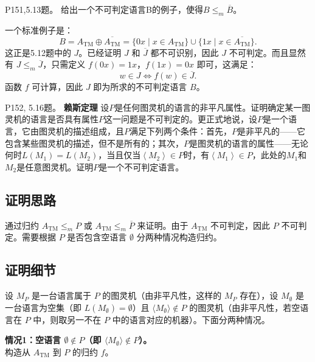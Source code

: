 \documentclass[11pt,addpoints,answers]{exam}
\begin{document}
\begin{questions}
\question P151,5.13题。
给出一个不可判定语言B的例子，使得$B\leq _{m} \overline{B}$。
\begin{solution}
	一个标准例子是：
    \[
    B = A_{\mathrm{TM}} \oplus \overline{A_{\mathrm{TM}}} = \{0x \mid x \in A_{\mathrm{TM}}\} \cup \{1x \mid x \in \overline{A_{\mathrm{TM}}}\}.
    \]
    这正是5.12题中的 $J$。已经证明 $J$ 和 $\overline{J}$ 都不可识别，因此 $J$ 不可判定。而且显然有 $J \leq_m \overline{J}$，只需定义 $f(0x) = 1x$，$f(1x) = 0x$ 即可，这满足：
    \[
    w \in J \iff f(w) \in \overline{J}.
    \]
    函数 $f$ 可计算，因此 $J$ 即为所求的不可判定语言 $B$。
\end{solution}



 




\question P152, 5.16题。
\textbf{赖斯定理} \quad 设$P$是任何图灵机的语言的非平凡属性。证明确定某一图灵机的语言是否具有属性$P$这一问题是不可判定的。更正式地说，设$P$是一个语言，它由图灵机的描述组成，且$P$满足下列两个条件：首先，$P$是非平凡的——它包含某些图灵机的描述，但不是所有的；其次，$P$是图灵机的语言的属性——无论何时$L(M_{1})=L(M_{2})$，当且仅当$\left \langle M_{2} \right \rangle \in P $时，有$\left \langle M_{1} \right \rangle \in P $，此处的$M_{1} $和$M_{2} $是任意图灵机。证明$P$是一个不可判定语言。
\begin{solution}

	\subsection*{证明思路}
    通过归约 $A_{\mathrm{TM}} \leq_m P$ 或 $A_{\mathrm{TM}} \leq_m \overline{P}$ 来证明。由于 $A_{\mathrm{TM}}$ 不可判定，因此 $P$ 不可判定。需要根据 $P$ 是否包含空语言 $\emptyset$ 分两种情况构造归约。
    
    \subsection*{证明细节}
    设 $M_P$ 是一台语言属于 $P$ 的图灵机（由非平凡性，这样的 $M_P$ 存在），设 $M_{\emptyset}$ 是一台语言为空集（即 $L(M_{\emptyset}) = \emptyset$）且 $\langle M_{\emptyset} \rangle \notin P$ 的图灵机（由非平凡性，若空语言在 $P$ 中，则取另一不在 $P$ 中的语言对应的机器）。下面分两种情况。
    
    \noindent \textbf{情况1：空语言 $\emptyset \notin P$（即 $\langle M_{\emptyset} \rangle \notin P$）。} \\
    构造从 $A_{\mathrm{TM}}$ 到 $P$ 的归约 $f$。
    

\end{solution}
\end{questions}
\end{document}
